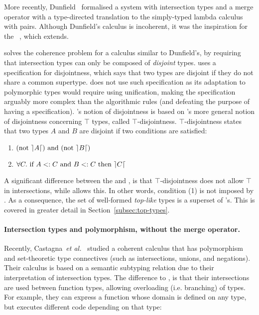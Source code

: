 More recently, Dunfield~\cite{dunfield2014elaborating} formalised a system with
intersection types and a merge operator with a type-directed translation to the
simply-typed lambda calculus with pairs. Although Dunfield's calculus
is incoherent, it was the inspiration for the
\oldname~\cite{oliveira16disjoint}, which \name extends.

\oldname solves the coherence problem for a calculus similar to Dunfield's, by requiring that
intersection types can only be composed of \emph{disjoint} types.
\oldname uses a specification for disjointness, which says that two types are 
disjoint if they do not share a common supertype.
\name does not use such specification as its adaptation to polymorphic types would require
using unification, making the specification arguably more complex than
the algorithmic rules (and defeating the purpose of having a
specification). \name's notion of disjointness is based on \oldname's more
general notion of disjointness concerning $\top$ types, called
$\top$-disjointness. $\top$-disjointness 
states that two types $A$ and $B$ are disjoint if two conditions are satisfied:
\begin{enumerate}
  \item $(\text{not}~\rceil A \lceil)~\text{and}~(\text{not}~\rceil B \lceil) $
  \item $\forall C.~\text{if}~ A <: C~\text{and}~B <: C~\text{then}~\rceil C \lceil$
\end{enumerate}
\noindent A significant difference between the \name and \oldname, is that $\top$-disjointness does not allow
$\top$ in intersections, while \name allows this.
In other words, condition (1) is not imposed by \name.
As a consequence, the set of well-formed \emph{top-like} types is a superset of \oldname's.
This is covered in greater detail in Section~\ref{subsec:top-types}.

\paragraph{Intersection types and polymorphism, without the merge operator.}
Recently, Castagna~\textit{et al.}~\cite{Castagna:2014} studied a 
coherent calculus that has polymorphism and set-theoretic type connectives (such as
intersections, unions, and negations). 
Their calculus is based on a semantic subtyping relation due to their 
interpretation of intersection types.
The difference to \name, is that their intersections are used between function
types, allowing overloading (i.e. branching) of types.
For example, they can express a function whose domain is defined on any type, but executes different
code depending on that type:

